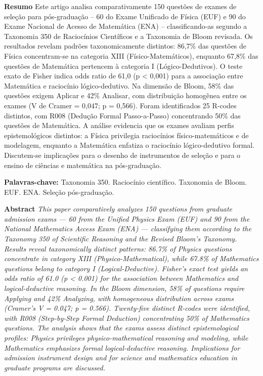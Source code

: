 \documentclass[
  12pt,
  a4paper,
  twoside,
  brazilian
]{article}
\begin{document}
\textbf{Resumo} Este artigo analisa comparativamente 150 questões de exames de seleção para pós-graduação -- 60 do Exame Unificado de Física (EUF) e 90 do Exame Nacional de Acesso de Matemática (ENA) -- classificando-as segundo a Taxonomia 350 de Raciocínios Científicos e a Taxonomia de Bloom revisada. Os resultados revelam padrões taxonomicamente distintos: 86,7\% das questões de Física concentram-se na categoria XIII (Físico-Matemáticos), enquanto 67,8\% das questões de Matemática pertencem à categoria I (Lógico-Dedutivos). O teste exato de Fisher indica odds ratio de 61,0 (p < 0,001) para a associação entre Matemática e raciocínio lógico-dedutivo. Na dimensão de Bloom, 58\% das questões exigem Aplicar e 42\% Analisar, com distribuição homogênea entre os exames (V de Cramer = 0,047; p = 0,566). Foram identificados 25 R-codes distintos, com R008 (Dedução Formal Passo-a-Passo) concentrando 50\% das questões de Matemática. A análise evidencia que os exames avaliam perfis epistemológicos distintos: a Física privilegia raciocínios físico-matemáticos e de modelagem, enquanto a Matemática enfatiza o raciocínio lógico-dedutivo formal. Discutem-se implicações para o desenho de instrumentos de seleção e para o ensino de ciências e matemática na pós-graduação.

\textbf{Palavras-chave:} Taxonomia 350. Raciocínio científico. Taxonomia
de Bloom. EUF. ENA. Seleção pós-graduação.

\textbf{Abstract} \emph{This paper comparatively analyzes 150 questions
from graduate admission exams --- 60 from the Unified Physics Exam (EUF)
and 90 from the National Mathematics Access Exam (ENA) --- classifying
them according to the Taxonomy 350 of Scientific Reasoning and the
Revised Bloom's Taxonomy. Results reveal taxonomically distinct
patterns: 86.7\% of Physics questions concentrate in category XIII
(Physico-Mathematical), while 67.8\% of Mathematics questions belong to
category I (Logical-Deductive). Fisher's exact test yields an odds ratio
of 61.0 (p \textless{} 0.001) for the association between Mathematics
and logical-deductive reasoning. In the Bloom dimension, 58\% of
questions require Applying and 42\% Analyzing, with homogeneous
distribution across exams (Cramer's V = 0.047; p = 0.566). Twenty-five
distinct R-codes were identified, with R008 (Step-by-Step Formal
Deduction) concentrating 50\% of Mathematics questions. The analysis
shows that the exams assess distinct epistemological profiles: Physics
privileges physico-mathematical reasoning and modeling, while
Mathematics emphasizes formal logical-deductive reasoning. Implications
for admission instrument design and for science and mathematics
education in graduate programs are discussed.}
\end{document}
